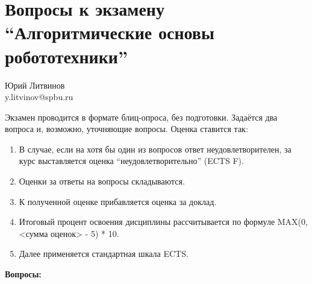\documentclass[a5paper]{article}
\begin{document}
\thispagestyle{empty}

\section*{Вопросы к экзамену \enquote{Алгоритмические основы робототехники}}

\begin{flushright}\begin{small}Юрий Литвинов\\\small{y.litvinov@spbu.ru}\end{small}\end{flushright}

Экзамен проводится в формате блиц-опроса, без подготовки. Задаётся два вопроса и, возможно, уточняющие вопросы. Оценка ставится так:

\begin{enumerate}
    \item В случае, если на хотя бы один из вопросов ответ неудовлетворителен, за курс выставляется оценка \enquote{неудовлетворительно} (ECTS F).
    \item Оценки за ответы на вопросы складываются.
    \item К полученной оценке прибавляется оценка за доклад.
    \item Итоговый процент освоения дисциплины рассчитывается по формуле MAX(0, <сумма оценок> - 5) * 10.
    \item Далее применяется стандартная шкала ECTS.
\end{enumerate}

\textbf{Вопросы:}
\end{document}
